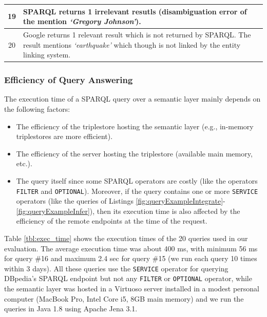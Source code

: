 \documentclass[twocolumn]{svjour3}
\begin{document}
\begin{table}[]
\begin{tabular}{|c|p{155mm}|}
19                                                           & SPARQL returns 1 irrelevant resutls (disambiguation error of the mention {\em \lq{}Gregory Johnson'}).   \\ \hline
20                                                           & Google returns 1 relevant result which is not returned by SPARQL. The result mentions {\em \lq{}earthquake'} which though is not linked by the entity linking system.                                                                                                                                                                          \\ \hline
\end{tabular}
\end{table}

\subsubsection*{Efficiency of Query Answering}
The execution time of a SPARQL query over a semantic layer mainly depends on
the following factors:
\begin{itemize}
\item
The efficiency of the triplestore hosting the semantic layer
   (e.g., in-memory triplestores are more efficient).

\item
The efficiency of the server hosting the triplestore (available main memory, etc.).

\item
The query itself since some SPARQL operators are costly (like the operators {\tt FILTER}
and {\tt OPTIONAL}).
Moreover, if the query contains
one or more {\tt SERVICE} operators (like the queries of
Listings \ref{fig:queryExampleIntegrate}-\ref{fig:queryExampleInfer}),
then its execution time is also affected by the efficiency of
the remote endpoints at the time of the request.
\end{itemize}


Table \ref{tbl:exec_time} shows the execution times
of the 20 queries used in our evaluation.
The average execution time was about 400 ms,
with minimum 56 ms for query \#16 and maximum 2.4 sec for query \#15
(we run each query 10 times within 3 days).
All these queries use the {\tt SERVICE} operator for
querying DBpedia's SPARQL endpoint but not any {\tt FILTER} or {\tt OPTIONAL} operator,
while the semantic layer was hosted in a Virtuoso server installed
in a modest personal computer (MacBook Pro, Intel Core i5, 8GB main memory)
and we run the queries in Java 1.8 using Apache Jena 3.1.
\end{document}
